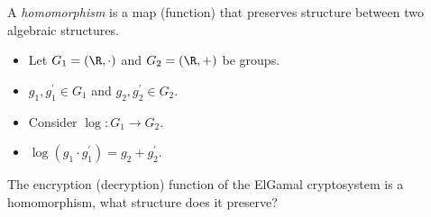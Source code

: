 \begin{frame}
  \begin{definition}[Homomorphism]
    A \emph{homomorphism} is a map (function) that preserves structure between 
    two algebraic structures.
  \end{definition}

  \pause{}

  \begin{example}
    \begin{itemize}
      \item Let \(G_1 = (\R, \cdot)\) and \(G_2 = (\R, +)\) be groups.
      \item \(g_1, g_1^\prime\in G_1\) and \(g_2, g_2^\prime\in G_2\).

        \pause{}

      \item Consider \(\log\colon G_1\to G_2\).
        
        \pause{}

      \item \(\log(g_1\cdot g_1^\prime) = g_2 + g_2^\prime\).
    \end{itemize}
  \end{example}
\end{frame}

\begin{frame}
  \begin{exercise}
    The encryption (decryption) function of the ElGamal cryptosystem is 
    a homomorphism, what structure does it preserve?
  \end{exercise}
\end{frame}

